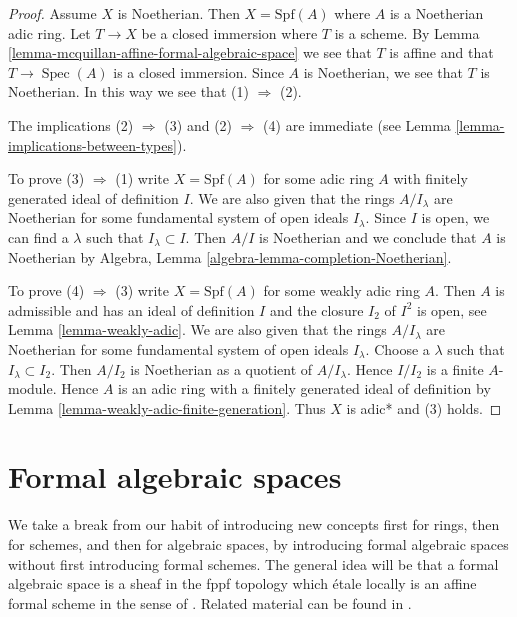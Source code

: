 \documentclass{stacks-project}
\theoremstyle{plain}
\theoremstyle{definition}
\theoremstyle{remark}
\numberwithin{equation}{subsection}
\def\Spec{\mathop{\mathrm{Spec}}}
\begin{document}
\begin{proof}
Assume $X$ is Noetherian. Then $X = \text{Spf}(A)$ where
$A$ is a Noetherian adic ring.
Let $T \to X$ be a closed immersion where $T$ is a scheme.
By Lemma \ref{lemma-mcquillan-affine-formal-algebraic-space}
we see that $T$ is affine and that $T \to \Spec(A)$ is a closed
immersion. Since $A$ is Noetherian, we see that $T$ is Noetherian.
In this way we see that (1) $\Rightarrow$ (2).

\medskip\noindent
The implications (2) $\Rightarrow$ (3) and (2) $\Rightarrow$ (4) are
immediate (see Lemma \ref{lemma-implications-between-types}).

\medskip\noindent
To prove (3) $\Rightarrow$ (1) write $X = \text{Spf}(A)$
for some adic ring $A$ with finitely generated ideal of definition $I$.
We are also given that the rings $A/I_\lambda$ are Noetherian
for some fundamental system of open ideals $I_\lambda$.
Since $I$ is open, we can find a $\lambda$ such that $I_\lambda \subset I$.
Then $A/I$ is Noetherian and we conclude that $A$ is Noetherian by
Algebra, Lemma \ref{algebra-lemma-completion-Noetherian}.

\medskip\noindent
To prove (4) $\Rightarrow$ (3) write $X = \text{Spf}(A)$
for some weakly adic ring $A$. Then $A$ is admissible and
has an ideal of definition $I$ and the closure $I_2$ of $I^2$
is open, see Lemma \ref{lemma-weakly-adic}.
We are also given that the rings $A/I_\lambda$ are Noetherian
for some fundamental system of open ideals $I_\lambda$.
Choose a $\lambda$ such that $I_\lambda \subset I_2$.
Then $A/I_2$ is Noetherian as a quotient of $A/I_\lambda$.
Hence $I/I_2$ is a finite $A$-module.
Hence $A$ is an adic ring with a finitely generated ideal
of definition by Lemma \ref{lemma-weakly-adic-finite-generation}.
Thus $X$ is adic* and (3) holds.
\end{proof}





\section{Formal algebraic spaces}
\label{section-formal-algebraic-spaces}

\noindent
We take a break from our habit of introducing new concepts first
for rings, then for schemes, and then for algebraic spaces, by
introducing formal algebraic spaces without first introducing
formal schemes. The general idea will be that a formal algebraic space
is a sheaf in the fppf topology which \'etale locally is an
affine formal scheme in the sense of \cite{BVGD}.
Related material can be found in \cite{Yasuda}.
\end{document}
